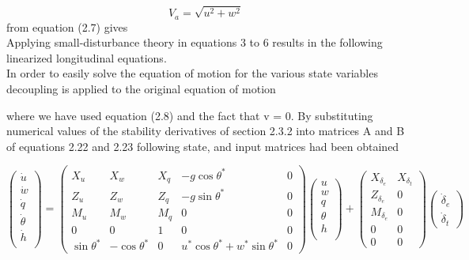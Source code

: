 \documentclass[12pt]{article}
\begin{document}
\begin{equation}
    V_a = \sqrt{u^2 + w^2}
\end{equation}
from equation (2.7) gives\\

Applying small-disturbance theory in equations 3 to 6 results in the following linearized longitudinal equations. \\
In order to easily solve the equation of motion for the various state variables decoupling is applied to the original equation of motion



where we have used equation (2.8) and the fact that v = 0.  By substituting numerical values of the stability derivatives of section 2.3.2 into matrices A and B of
equations 2.22 and 2.23 following state, and input matrices had been obtained

\begin{equation}
\begin{pmatrix}
\dot{u} \\
\dot{w} \\
\dot{q} \\
\dot{\theta} \\
\dot{h} \\
\end{pmatrix} =
  \begin{pmatrix}
    X_u & X_w & X_q & -g\cos\theta^{\ast} & 0 \\
    Z_u & Z_w & Z_q & -g\sin\theta^{\ast} & 0 \\
    M_u & M_w & M_q & 0 & 0 \\
    0   & 0   & 1   & 0 & 0 \\
    \sin\theta^{\ast} & -\cos\theta^{\ast} & 0 & u^{\ast}\cos\theta^{\ast} +
    w^{\ast}\sin\theta^{\ast} & 0
  \end{pmatrix}
\begin{pmatrix}
u \\
w \\
q \\
\theta \\
h \\
\end{pmatrix}
+
\begin{pmatrix}
  X_{\delta_e} & X_{\delta_t} \\
  Z_{\delta_e} & 0 \\
  M_{\delta_e} & 0 \\
  0            & 0 \\
  0            & 0
  \end{pmatrix}
\begin{pmatrix}
\dot{\delta}_e \\
\dot{\delta}_t
\end{pmatrix}
\end{equation}
\end{document}
